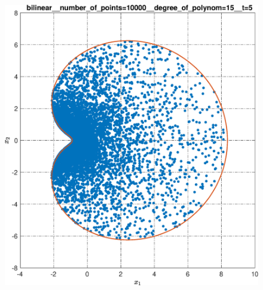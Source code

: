 \documentclass[../main.tex]{subfiles}
\begin{document}
\begin{figure}[ht!]
\begin{minipage}[b]{.3\linewidth}
  	\end{minipage} 
  	\vfill
  	\hspace{-2.5ex}
  	\begin{minipage}[b]{.3\linewidth} 
  		\small
  		\centering 
  		\includegraphics[width=\linewidth]{images/bilinear__number_of_points=10000__degree_of_polynom=15__t=5.eps}
  	\end{minipage}
  	\hfill
  	\begin{minipage}[b]{.3\linewidth} 
  		\small
  		\centering

\end{minipage}
\end{figure}
\end{document}
